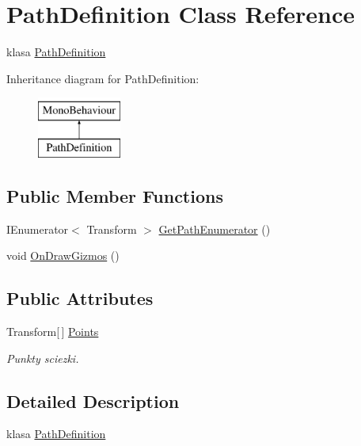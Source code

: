 \hypertarget{class_path_definition}{}\section{Path\+Definition Class Reference}
\label{class_path_definition}


klasa \hyperlink{class_path_definition}{Path\+Definition}  


Inheritance diagram for Path\+Definition\+:\begin{figure}[H]
\begin{center}
\leavevmode
\includegraphics[height=2.000000cm]{class_path_definition}
\end{center}
\end{figure}
\subsection*{Public Member Functions}
\begin{DoxyCompactItemize}
\item 
I\+Enumerator$<$ Transform $>$ \hyperlink{class_path_definition_a0526b4b4e15883dad98b64bbed920f96}{Get\+Path\+Enumerator} ()
\item 
void \hyperlink{class_path_definition_a5539d857e10ad2827afc1fbce1512e47}{On\+Draw\+Gizmos} ()
\end{DoxyCompactItemize}
\subsection*{Public Attributes}
\begin{DoxyCompactItemize}
\item 
\hypertarget{class_path_definition_ab2d82757e323cdfcdb25cf2111c12310}{}Transform\mbox{[}$\,$\mbox{]} \hyperlink{class_path_definition_ab2d82757e323cdfcdb25cf2111c12310}{Points}\label{class_path_definition_ab2d82757e323cdfcdb25cf2111c12310}

\begin{DoxyCompactList}\small\item\em Punkty sciezki. \end{DoxyCompactList}\end{DoxyCompactItemize}


\subsection{Detailed Description}
klasa \hyperlink{class_path_definition}{Path\+Definition} 



